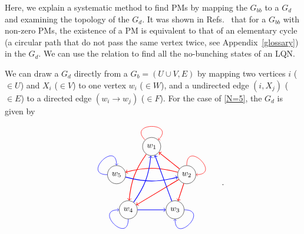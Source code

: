 \documentclass[a4paper,twocolumn,8pt,accepted=2021-12-15]{quantumarticle}
\begin{document}
	Here, we explain a systematic method to find PMs by mapping the $G_{bb}$ to a $G_{d}$ and examining the topology of the $G_d$. It was shown in Refs.~\cite{fukuda1994finding,tassa2012finding} that for a $G_{bb}$ with non-zero PMs, the existence of a PM is equivalent to that of an elementary cycle (a circular path that do not pass the same vertex twice, see Appendix~\ref{glossary}) in the $G_{d}$.
	We can use the relation to find all the no-bunching states of an LQN.
	
	We can draw a $G_d$ directly from a $G_b= (U\cup V, E)$ by mapping two vertices $i$ ($\in U$) and $X_i$ ($\in V$) to one vertex $w_i$ ($\in W$), and a undirected edge $(i, X_j)$ ($\in E $) to a directed edge $(w_i\to w_j)$ ($\in F$).
	For the case of \eqref{N=5}, the $G_d$ is  given by
	\begin{align}\label{N=5_Gd}
		\begin{tikzpicture}[baseline={([yshift=-.5ex]current bounding box.center)}]
			\node[circle,draw] (a) at (6,2.7) {$w_1$};
			\node[circle,draw] (b) at (7.5,1.5) {$w_2$};		
			\node[circle,draw] (c) at (7,0) {$w_3$};
			\node[circle,draw] (d) at (5,0) {$w_4$};
			\node[circle,draw] (e) at (4.5,1.5) {$w_5$};		
			\path[every loop/.style={min distance=10mm,in=45,out=135,looseness=5,color=red ,->},line width = 0.5pt] (a) edge [loop above]   (a);
			\path[every loop/.style={min distance=10mm,in=0,out=90,looseness=5,color=red},line width = 0.5pt,->] (b) edge [loop above] (b);
			\path[every loop/.style={min distance=10mm,in=270,out=0,looseness=5,color=blue ,->},line width = 0.5pt] (c) edge [loop above]  (c);
			\path[every loop/.style={min distance=10mm,in=180,out=270,looseness=5,color=blue ,->},line width = 0.5pt] (d) edge [loop above]  (d);
			\path[every loop/.style={min distance=10mm,in=90,out=180,looseness=5,color=blue ,->},line width = 0.5pt] (e) edge [loop above]  (e);				
			\path[line width = 0.8pt,color=red,->] (b) edge (a);
			\path[line width = 0.8pt,color=red,->] (a) edge[bend right=15] (d);	
			\path[line width = 0.8pt,color=red,->] (b) edge (c);
			\path[line width = 0.8pt,color=red,->] (b) edge (d);
			\path[line width = 0.8pt,color=red,->] (b) edge[bend right=15] (e);	
			\path[line width = 0.8pt,color=blue ,->] (c) edge (a);
			\path[line width = 0.8pt,color=blue ,->] (d) edge (c);
			\path[line width = 0.8pt,color=blue ,->] (d) edge[bend right=15] (a);
			\path[line width = 0.8pt,color=blue ,->] (e) edge[bend right=15] (b);	
		\end{tikzpicture}.
	\end{align} 
	
\end{document}

